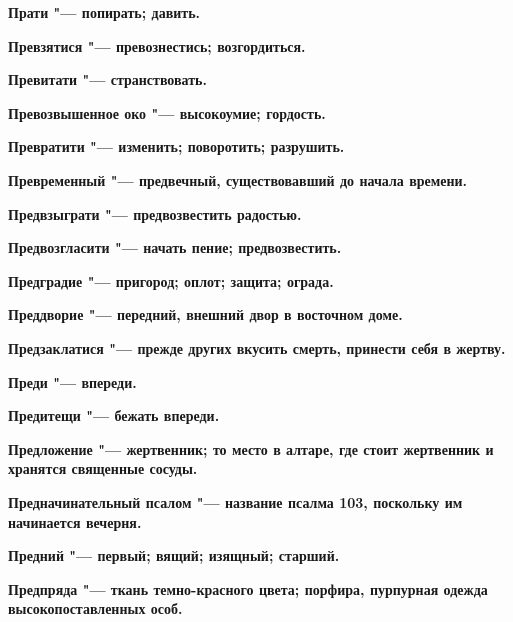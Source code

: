 \begin{mymulticols}{2}
\bfseries Прати\normalfont{} "--- попирать; давить. 




\bfseries Превзятися\normalfont{} "--- превознестись; возгордиться. 




\bfseries Превитати\normalfont{} "--- странствовать. 




\bfseries Превозвышенное око\normalfont{} "--- высокоумие; гордость. 




\bfseries Превратити\normalfont{} "--- изменить; поворотить; разрушить. 




\bfseries Превременный\normalfont{} "--- предвечный, существовавший до начала времени. 




\bfseries Предвзыграти\normalfont{} "--- предвозвестить радостью. 




\bfseries Предвозгласити\normalfont{} "--- начать пение; предвозвестить. 




\bfseries Предградие\normalfont{} "--- пригород; оплот; защита; ограда. 




\bfseries Преддворие\normalfont{} "--- передний, внешний двор в восточном доме. 




\bfseries Предзаклатися\normalfont{} "--- прежде других вкусить смерть, принести себя в жертву. 




\bfseries Преди\normalfont{} "--- впереди. 




\bfseries Предитещи\normalfont{} "--- бежать впереди. 




\bfseries Предложение\normalfont{} "--- жертвенник; то место в алтаре, где стоит жертвенник и хранятся священные сосуды. 




\bfseries Предначинательный псалом\normalfont{} "--- название псалма 103, поскольку им начинается вечерня. 




\bfseries Предний\normalfont{} "--- первый; вящий; изящный; старший. 




\bfseries Предпряда\normalfont{} "--- ткань темно-красного цвета; порфира, пурпурная одежда высокопоставленных особ. 





\end{mymulticols}

